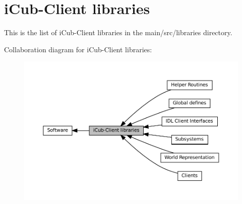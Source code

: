 \hypertarget{group__icubclient__libraries}{}\section{i\+Cub-\/\+Client libraries}
\label{group__icubclient__libraries}


This is the list of i\+Cub-\/\+Client libraries in the main/src/libraries directory.  


Collaboration diagram for i\+Cub-\/\+Client libraries\+:
\nopagebreak
\begin{figure}[H]
\begin{center}
\leavevmode
\includegraphics[width=350pt]{group__icubclient__libraries}
\end{center}
\end{figure}
